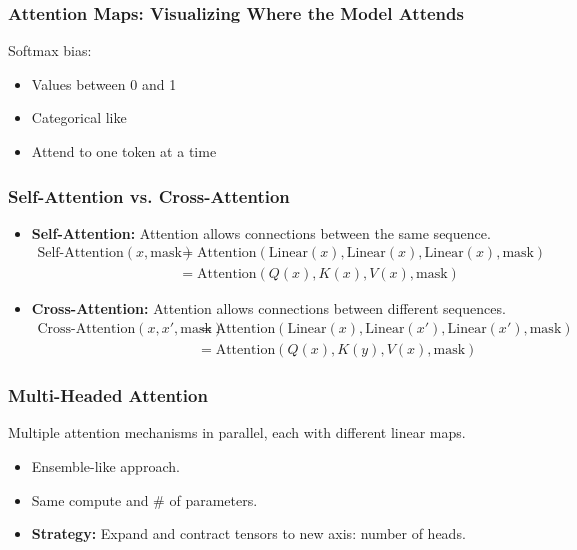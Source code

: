 \subsubsection{Attention Maps: Visualizing Where the Model Attends}
\begin{notes} Softmax bias:
    \begin{itemize}
        \item Values between 0 and 1
        \item Categorical like
        \item Attend to one token at a time
    \end{itemize}
\end{notes}
\newpage

\subsubsection{Self-Attention vs. Cross-Attention}
\begin{notes}
    \begin{itemize}
        \item \textbf{Self-Attention:} Attention allows connections between the same sequence.
        \begin{align*}
            \text{Self-Attention}(x,\text{mask}) &= \text{Attention}(\text{Linear}(x), \text{Linear}(x), \text{Linear}(x),\text{mask}) \\
            &= \text{Attention}(Q(x), K(x), V(x),\text{mask}) 
        \end{align*}
        \item \textbf{Cross-Attention:} Attention allows connections between different sequences.
        \begin{align*}
            \text{Cross-Attention}(x, x', \text{mask}) &= \text{Attention}(\text{Linear}(x), \text{Linear}(x'), \text{Linear}(x'),\text{mask})\\
            &= \text{Attention}(Q(x), K(y), V(x),\text{mask})
        \end{align*}
    \end{itemize}
\end{notes}

\subsubsection{Multi-Headed Attention}
\begin{notes}
    Multiple attention mechanisms in parallel, each with different linear maps.
    \begin{itemize}
        \item Ensemble-like approach. 
        \item Same compute and \# of parameters. 
        \item \textbf{Strategy:} Expand and contract tensors to new axis: number of heads. 
    \end{itemize}
\end{notes}
\newpage

